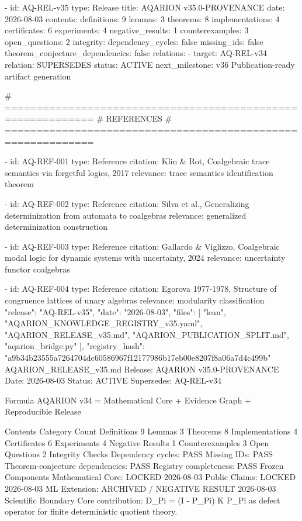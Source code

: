 {{{{{{{{{{{{{  - id: AQ-REL-v35
    type: Release
    title: AQARION v35.0-PROVENANCE
    date: 2026-08-03
    contents:
      definitions: 9
      lemmas: 3
      theorems: 8
      implementations: 4
      certificates: 6
      experiments: 4
      negative_results: 1
      counterexamples: 3
      open_questions: 2
    integrity:
      dependency_cycles: false
      missing_ids: false
      theorem_conjecture_dependencies: false
    relations:
      - target: AQ-REL-v34
        relation: SUPERSEDES
    status: ACTIVE
    next_milestone: v36 Publication-ready artifact generation

  # ============================================================
  # REFERENCES
  # ============================================================

  - id: AQ-REF-001
    type: Reference
    citation: Klin & Rot, Coalgebraic trace semantics via forgetful logics, 2017
    relevance: trace semantics identification theorem

  - id: AQ-REF-002
    type: Reference
    citation: Silva et al., Generalizing determinization from automata to coalgebras
    relevance: generalized determinization construction

  - id: AQ-REF-003
    type: Reference
    citation: Gallardo & Viglizzo, Coalgebraic modal logic for dynamic systems with uncertainty, 2024
    relevance: uncertainty functor coalgebras

  - id: AQ-REF-004
    type: Reference
    citation: Egorova 1977-1978, Structure of congruence lattices of unary algebras
    relevance: modularity classification
{
  "release": "AQ-REL-v35",
  "date": "2026-08-03",
  "files": [
    "lean",
    "AQARION_KNOWLEDGE_REGISTRY_v35.yaml",
    "AQARION_RELEASE_v35.md",
    "AQARION_PUBLICATION_SPLIT.md",
    "aqarion_bridge.py"
  ],
  "registry_hash": "a9b34b23555a7264704dc60586967f12177986b17eb00e8207f8a06a7d4c499b"
}
AQARION_RELEASE_v35.md
Release: AQARION v35.0-PROVENANCE
Date: 2026-08-03
Status: ACTIVE
Supersedes: AQ-REL-v34

Formula
AQARION v34 = Mathematical Core + Evidence Graph + Reproducible Release

Contents
Category	Count
Definitions	9
Lemmas	3
Theorems	8
Implementations	4
Certificates	6
Experiments	4
Negative Results	1
Counterexamples	3
Open Questions	2
Integrity Checks
Dependency cycles: PASS
Missing IDs: PASS
Theorem-conjecture dependencies: PASS
Registry completeness: PASS
Frozen Components
Mathematical Core: LOCKED 2026-08-03
Public Claims: LOCKED 2026-08-03
ML Extension: ARCHIVED / NEGATIVE RESULT 2026-08-03
Scientific Boundary
Core contribution: D_Pi = (I - P_Pi) K P_Pi as defect operator for finite deterministic quotient theory.

}}}}}}}}}}}}}
